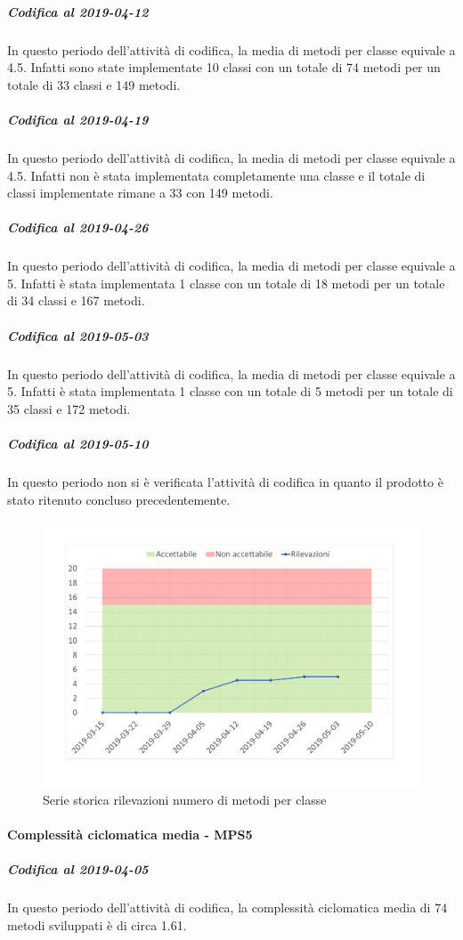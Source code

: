 \subparagraph{Codifica al 2019-04-12}
In questo periodo dell'attività di codifica, la media di metodi per classe equivale a 4.5. Infatti sono state implementate 10 classi con un totale di 74 metodi per un totale di 33 classi e 149 metodi.

\subparagraph{Codifica al 2019-04-19}
In questo periodo dell'attività di codifica, la media di metodi per classe equivale a 4.5. Infatti non è stata implementata completamente una classe e il totale di classi implementate rimane a 33 con 149 metodi.

\subparagraph{Codifica al 2019-04-26}
In questo periodo dell'attività di codifica, la media di metodi per classe equivale a 5. Infatti è stata implementata 1 classe con un totale di 18 metodi per un totale di 34 classi e 167 metodi.

\subparagraph{Codifica al 2019-05-03}
In questo periodo dell'attività di codifica, la media di metodi per classe equivale a 5. Infatti è stata implementata 1 classe con un totale di 5 metodi per un totale di 35 classi e 172 metodi.

\subparagraph{Codifica al 2019-05-10}
In questo periodo non si è verificata l'attività di codifica in quanto il prodotto è stato ritenuto concluso precedentemente.

\begin{figure}[H]
	\centering
	\includegraphics[scale=0.6]{images/resoconto/MPS4Chart.pdf}
	\caption{Serie storica rilevazioni numero di metodi per classe}	
\end{figure}

\paragraph{Complessità ciclomatica media - MPS5}
\subparagraph{Codifica al 2019-04-05}
In questo periodo dell'attività di codifica, la complessità ciclomatica media di 74 metodi sviluppati è di circa 1.61. 

